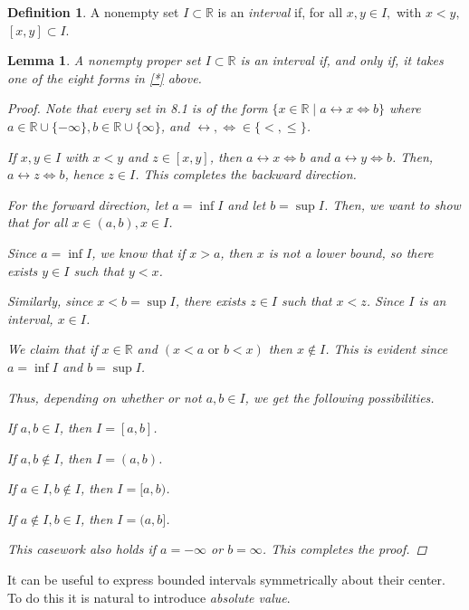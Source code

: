\documentclass[11pt]{article}
\newcommand{\bbR}{\mathbb{R}}
\newtheorem{lemma}[theorem]{Lemma}
\theoremstyle{definition}
\newtheorem{definition}[theorem]{Definition}
\numberwithin{equation}{section}
\begin{document}
\begin{definition}
A nonempty set $I\subset \bbR$ is an {\em interval} if, for all $x,y\in I,$ with $x<y,$ $[x,y]\subset I.$
\end{definition}

\begin{lemma}
A nonempty proper set $I\subset \bbR$ is an {\em interval} if, and only if, it takes one of the eight forms in \eqref{*} above.


\begin{proof}
Note that every set in 8.1 is of the form $\{x \in \bbR \mid a \leftrightarrow x \Leftrightarrow b\}$ where $a \in \bbR \cup \{-\infty\}, b\in \bbR \cup \{\infty\}$, and $\leftrightarrow, \Leftrightarrow \in \{<, \leq\}$.

If $x,y \in I$ with $x<y$ and $z \in [x,y]$, then $a \leftrightarrow x \Leftrightarrow b$ and $a \leftrightarrow y \Leftrightarrow b$. Then, $a \leftrightarrow z \Leftrightarrow b$, hence $z \in I$. This completes the backward direction.

For the forward direction, let $a = \inf I$ and let $b=\sup I$. Then, we want to show that for all $x \in (a,b), x \in I$.

Since $a = \inf I$, we know that if $x>a$, then $x$ is not a lower bound, so there exists $y \in I$ such that $y<x$. 

Similarly, since $x<b=\sup I$, there exists $z \in I$ such that $x<z$. Since $I$ is an interval, $x \in I$.  

We claim that if $x \in \bbR$ and $(x<a \text{ or } b<x)$ then $x \notin I$. This is evident since $a = \inf I$ and $b=\sup I$.

Thus, depending on whether or not $a,b \in I$, we get the following possibilities.

If $a,b \in I$, then $I=[a,b]$.

If $a,b \notin I$, then $I=(a,b)$.

If $a\in I, b \notin I$, then $I=[a,b)$.

If $a\notin I, b \in I$, then $I=(a,b]$.

This casework also holds if $a =-\infty$ or $b = \infty$. This completes the proof.


\renewcommand\qedsymbol{QED}
\end{proof}

\end{lemma}


It can be useful to express bounded intervals symmetrically about their center. To do this it is natural to introduce {\em absolute value}.
\end{document}
